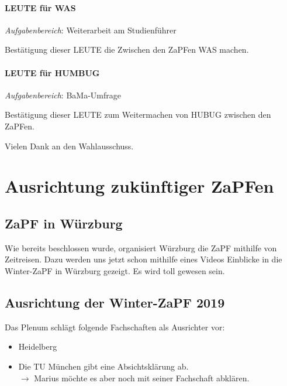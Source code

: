     \paragraph{LEUTE für WAS}
      \textit{Aufgabenbereich}: Weiterarbeit am Studienführer
      \begin{success}
        Bestätigung dieser LEUTE die Zwischen den ZaPFen WAS machen.
      \end{success}

    \paragraph{LEUTE für HUMBUG}
      \textit{Aufgabenbereich}: BaMa-Umfrage
      \begin{success}
        Bestätigung dieser LEUTE zum Weitermachen von HUBUG zwischen den ZaPFen.
      \end{success}

    Vielen Dank an den Wahlausschuss.

\section{Ausrichtung zukünftiger ZaPFen}
  \subsection{ZaPF in Würzburg}
    Wie bereits beschlossen wurde, organisiert Würzburg die ZaPF mithilfe von Zeitreisen. Dazu werden uns jetzt schon mithilfe eines Videos Einblicke in die Winter-ZaPF in Würzburg gezeigt. Es wird toll gewesen sein.


  \subsection{Ausrichtung der Winter-ZaPF 2019}
    Das Plenum schlägt folgende Fachschaften als Ausrichter vor:
    \begin{itemize}
      \item Heidelberg
      \item Die TU München gibt eine Absichtsklärung ab. \\ $\rightarrow$ Marius möchte es aber noch mit seiner Fachschaft abklären.
    \end{itemize}

